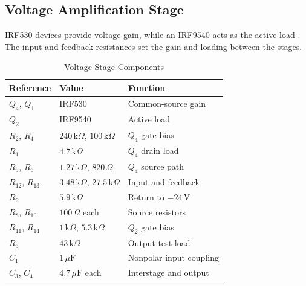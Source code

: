 \documentclass[conference,letterpaper]{IEEEtran}
\newcommand{\Ohm}{\Omega}
\newcommand{\kohm}{\mathrm{k}\Omega}
\newcommand{\uF}{\mu\mathrm{F}}
\newcommand{\V}{\mathrm{V}}
\begin{document}
\subsection{Voltage Amplification Stage}
IRF530 devices provide voltage gain, while an IRF9540 acts as the
active load \cite{va_irf530,va_irf9540}. The input and feedback
resistances set the gain and loading between the stages.
\begin{table}[H]
\centering\footnotesize
\caption{Voltage-Stage Components}
\label{tab:va_parts}
\begin{tabular}{@{}p{}p{}p{}@{}}
\toprule
Reference & Value & Function\\
\midrule
$Q_4$, $Q_1$ & IRF530 & Common-source gain\\
$Q_2$ & IRF9540 & Active load\\
$R_2$, $R_4$ & $240\,\kohm$, $100\,\kohm$ & $Q_4$ gate bias\\
$R_1$ & $4.7\,\kohm$ & $Q_4$ drain load\\
$R_5$, $R_6$ & $1.27\,\kohm$, $820\,\Ohm$ & $Q_4$ source path\\
$R_{12}$, $R_{13}$ & $3.48\,\kohm$, $27.5\,\kohm$ & Input and feedback\\
$R_9$ & $5.9\,\kohm$ & Return to $-24\,\V$\\
$R_8$, $R_{10}$ & $100\,\Ohm$ each & Source resistors\\
$R_{11}$, $R_{14}$ & $1\,\kohm$, $5.3\,\kohm$ & $Q_2$ gate bias\\
$R_3$ & $43\,\kohm$ & Output test load\\
$C_1$ & $1\,\uF$ & Nonpolar input coupling\\
$C_3$, $C_4$ & $4.7\,\uF$ each & Interstage and output\\
\bottomrule
\end{tabular}
\end{table}
\FloatBarrier
\end{document}
